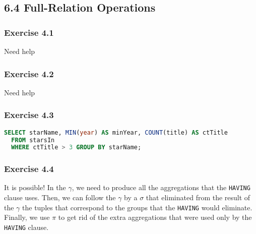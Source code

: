 \documentclass[../../main.tex]{subfiles}
\begin{document}
\subsection{6.4 Full-Relation Operations}

\subsubsection*{Exercise 4.1}


Need help

\subsubsection*{Exercise 4.2}


Need help

\subsubsection*{Exercise 4.3}

\begin{lstlisting}[language=sql]
  SELECT starName, MIN(year) AS minYear, COUNT(title) AS ctTitle
  FROM starsIn
  WHERE ctTitle > 3 GROUP BY starName;
\end{lstlisting}

\subsubsection*{Exercise 4.4}

It is possible! In the $\gamma$, we need to produce all the aggregations
that the \verb|HAVING| clause uses. Then, we can follow the $\gamma$
by a $\sigma$ that eliminated from the result of the $\gamma$
the tuples that correspond to the groups that the \verb|HAVING| would eliminate.
Finally, we use $\pi$ to get rid of the extra aggregations that
were used only by the \verb|HAVING| clause.
\end{document}

